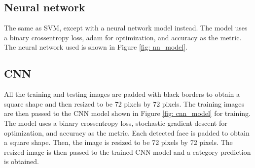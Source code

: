 \documentclass{article}
\begin{document}
\subsection*{Neural network}
The same as SVM, except with a neural network model instead. The model uses a binary crossentropy loss, adam for optimization, and accuracy as the metric. The neural network used is shown in Figure \ref{fig: nn_model}.

\subsection*{CNN}
All the training and testing images are padded with black borders to obtain a square shape and then resized to be 72 pixels by 72 pixels. The training images are then passed to the CNN model shown in Figure \ref{fig: cnn_model} for training. The model uses a binary crossentropy loss, stochastic gradient descent for optimization, and accuracy as the metric.
Each detected face is padded to obtain a square shape. Then, the image is resized to be 72 pixels by 72 pixels. The resized image is then passed to the trained CNN model and a category prediction is obtained.
\end{document}

